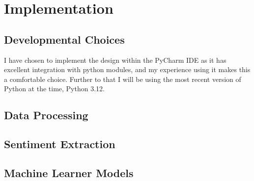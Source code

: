 \documentclass[11pt, a4paper]{article}
\begin{document}
\section{Implementation}
\subsection{Developmental Choices}
I have chosen to implement the design within the PyCharm IDE as it has excellent integration with python modules, and my experience using it makes this a comfortable choice. Further to that I will be using the most recent version of Python at the time, Python 3.12.

\subsection{Data Processing}

\subsection{Sentiment Extraction}

\subsection{Machine Learner Models}
\end{document}
